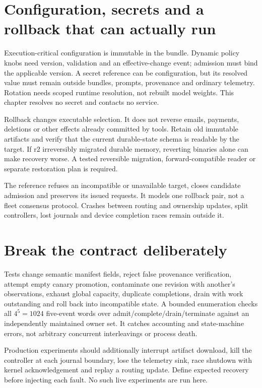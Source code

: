 \section{Configuration, secrets and a rollback that can actually run}
\label{evod44:rollback}
Execution-critical configuration is immutable in the bundle. Dynamic policy
knobs need version, validation and an effective-change event; admission must
bind the applicable version. A secret reference can be configuration, but its
resolved value must remain outside bundles, prompts, provenance and ordinary
telemetry. Rotation needs scoped runtime resolution, not rebuilt model weights.
This chapter resolves no secret and contacts no service.

Rollback changes executable selection. It does not reverse emails, payments,
deletions or other effects already committed by tools. Retain old immutable
artifacts and verify that the current durable-state schema is readable by
the target. If r2 irreversibly migrated durable memory, reverting binaries
alone can make recovery worse. A tested reversible migration, forward-compatible
reader or separate restoration plan is required.

The reference refuses an incompatible or unavailable target, closes candidate
admission and preserves its issued requests. It models one rollback pair,
not a fleet consensus protocol. Crashes between routing and ownership updates,
split controllers, lost journals and device completion races remain outside it.

\section{Break the contract deliberately}
\label{evod44:failure}
Tests change semantic manifest fields, reject false provenance verification,
attempt empty canary promotion, contaminate one revision with another's
observations, exhaust global capacity, duplicate completions, drain with work
outstanding and roll back into incompatible state. A bounded enumeration
checks all $4^5=1024$ five-event words over admit/complete/drain/terminate
against an independently maintained owner set. It catches accounting and
state-machine errors, not arbitrary concurrent interleavings or process death.

Production experiments should additionally interrupt artifact download, kill
the controller at each journal boundary, lose the telemetry sink, race shutdown
with kernel acknowledgement and replay a routing update. Define expected
recovery before injecting each fault. No such live experiments are run here.

